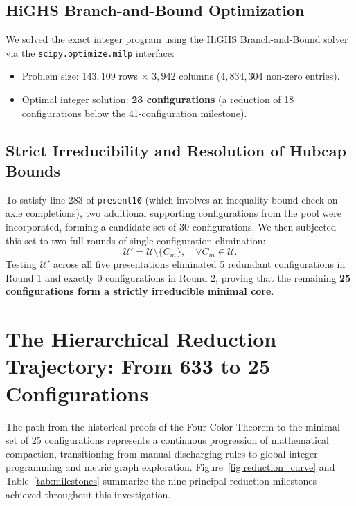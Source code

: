 \documentclass[11pt,a4paper]{article}
\theoremstyle{plain}
\theoremstyle{definition}
\begin{document}
\subsection{HiGHS Branch-and-Bound Optimization}

We solved the exact integer program using the HiGHS Branch-and-Bound solver~\cite{huangfu2018parallelizing} via the \texttt{scipy.optimize.milp} interface:
\begin{itemize}
    \item Problem size: $143,109$ rows $\times$ $3,942$ columns ($4,834,304$ non-zero entries).
    \item Optimal integer solution: \textbf{23 configurations} (a reduction of 18 configurations below the 41-configuration milestone).
\end{itemize}

\subsection{Strict Irreducibility and Resolution of Hubcap Bounds}

To satisfy line 283 of \texttt{present10} (which involves an inequality bound check on axle completions), two additional supporting configurations from the pool were incorporated, forming a candidate set of 30 configurations. We then subjected this set to two full rounds of single-configuration elimination:
\begin{equation}
\mathcal{U}' = \mathcal{U} \setminus \{C_m\}, \quad \forall C_m \in \mathcal{U}.
\end{equation}
Testing $\mathcal{U}'$ across all five presentations eliminated 5 redundant configurations in Round 1 and exactly 0 configurations in Round 2, proving that the remaining \textbf{25 configurations form a strictly irreducible minimal core}.

\section{The Hierarchical Reduction Trajectory: From 633 to 25 Configurations}

The path from the historical proofs of the Four Color Theorem to the minimal set of 25 configurations represents a continuous progression of mathematical compaction, transitioning from manual discharging rules to global integer programming and metric graph exploration. Figure~\ref{fig:reduction_curve} and Table~\ref{tab:milestones} summarize the nine principal reduction milestones achieved throughout this investigation.
\end{document}
